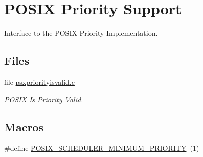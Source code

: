 \hypertarget{group__POSIX__PRIORITY}{}\section{P\+O\+S\+IX Priority Support}
\label{group__POSIX__PRIORITY}


Interface to the P\+O\+S\+IX Priority Implementation.  


\subsection*{Files}
\begin{DoxyCompactItemize}
\item 
file \mbox{\hyperlink{psxpriorityisvalid_8c}{psxpriorityisvalid.\+c}}
\begin{DoxyCompactList}\small\item\em P\+O\+S\+IX Is Priority Valid. \end{DoxyCompactList}\end{DoxyCompactItemize}
\subsection*{Macros}
\begin{DoxyCompactItemize}
\item 
\#define \mbox{\hyperlink{group__POSIX__PRIORITY_ga119f39be5f59872d706c6ab781f27173}{P\+O\+S\+I\+X\+\_\+\+S\+C\+H\+E\+D\+U\+L\+E\+R\+\_\+\+M\+I\+N\+I\+M\+U\+M\+\_\+\+P\+R\+I\+O\+R\+I\+TY}}~(1)
\end{DoxyCompactItemize}

